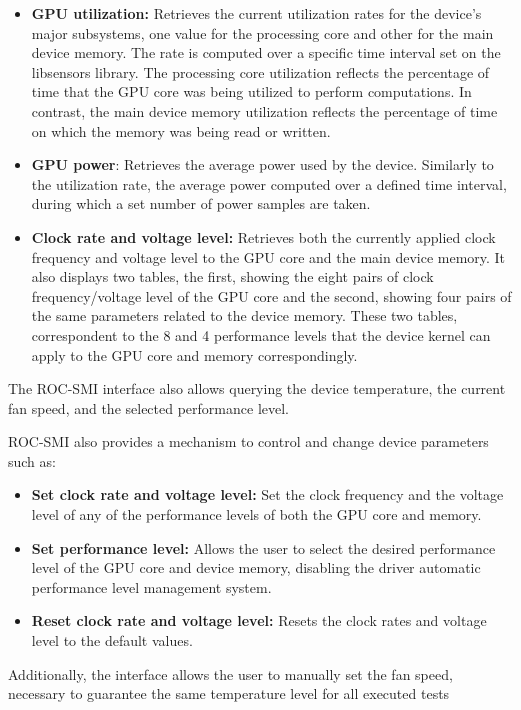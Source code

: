 \begin{itemize}
\item \textbf{GPU utilization:} Retrieves the current utilization rates for the device's major subsystems, one value for the processing core and other for the main device memory. The rate is computed over a specific time interval set on the libsensors library. The processing core utilization reflects the percentage of time that the GPU core was being utilized to perform computations. In contrast, the main device memory utilization reflects the percentage of time on which the memory was being read or written.

\item \textbf{GPU power}: Retrieves the average power used by the device. Similarly to the utilization rate, the average power computed over a defined time interval, during which a set number of power samples are taken.

\item \textbf{Clock rate and voltage level:} Retrieves both the currently applied clock frequency and voltage level to the GPU core and the main device memory. It also displays two tables, the first, showing the eight pairs of clock frequency/voltage level of the GPU core and the second, showing four pairs of the same parameters related to the device memory. These two tables, correspondent to the 8 and 4 performance levels that the device kernel can apply to the GPU core and memory correspondingly.
\end{itemize}

The ROC-SMI interface also allows querying the device temperature, the current fan speed, and the selected performance level.

ROC-SMI also provides a mechanism to control and change device parameters such as:
\begin{itemize}
\item \textbf{Set clock rate and voltage level:} Set the clock frequency and the voltage level of any of the performance levels of both the GPU core and memory. 
\item \textbf{Set performance level:} Allows the user to select the desired performance level of the GPU core and device memory, disabling the driver automatic performance level management system.
\item \textbf{Reset clock rate and voltage level:} Resets the clock rates and voltage level to the default values.
\end{itemize}

Additionally, the interface allows the user to manually set the fan speed, necessary to guarantee the same temperature level for all executed tests

